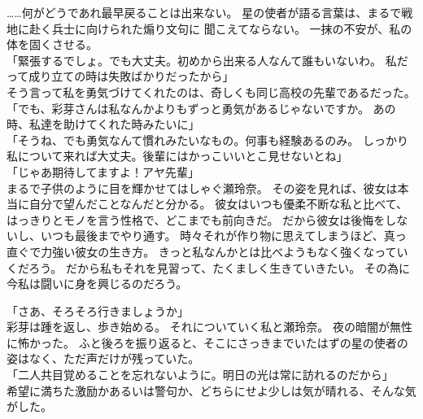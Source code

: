 \documentclass[autodetect-engine,dvipdfmx-if-dvi,a5paper,ja=standard,twoside,titlepage,final,twocolumn]{ltjtbook}
\begin{document}
……何がどうであれ最早戻ることは出来ない。
星の使者が語る言葉は、まるで戦地に赴く兵士に向けられた煽り文句に
聞こえてならない。
一抹の不安が、私の体を固くさせる。\\
「緊張するでしょ。でも大丈夫。初めから出来る人なんて誰もいないわ。
私だって成り立ての時は失敗ばかりだったから」\\
そう言って私を勇気づけてくれたのは、奇しくも同じ高校の先輩であるだった。\\
「でも、彩芽さんは私なんかよりもずっと勇気があるじゃないですか。
あの時、私達を助けてくれた時みたいに」\\
「そうね、でも勇気なんて慣れみたいなもの。何事も経験あるのみ。
しっかり私について来れば大丈夫。後輩にはかっこいいとこ見せないとね」\\
「じゃあ期待してますよ！アヤ先輩」\\
まるで子供のように目を輝かせてはしゃぐ瀬玲奈。
その姿を見れば、彼女は本当に自分で望んだことなんだと分かる。
彼女はいつも優柔不断な私と比べて、はっきりとモノを言う性格で、どこまでも前向きだ。
だから彼女は後悔をしないし、いつも最後までやり通す。
時々それが作り物に思えてしまうほど、真っ直ぐで力強い彼女の生き方。
きっと私なんかとは比べようもなく強くなっていくだろう。
だから私もそれを見習って、たくましく生きていきたい。
その為に今私は闘いに身を興じるのだろう。

「さあ、そろそろ行きましょうか」\\
彩芽は踵を返し、歩き始める。
それについていく私と瀬玲奈。
夜の暗闇が無性に怖かった。
ふと後ろを振り返ると、そこにさっきまでいたはずの星の使者の姿はなく、ただ声だけが残っていた。\\
「二人共目覚めることを忘れないように。明日の光は常に訪れるのだから」\\
希望に満ちた激励かあるいは警句か、どちらにせよ少しは気が晴れる、そんな気がした。
\end{document}
